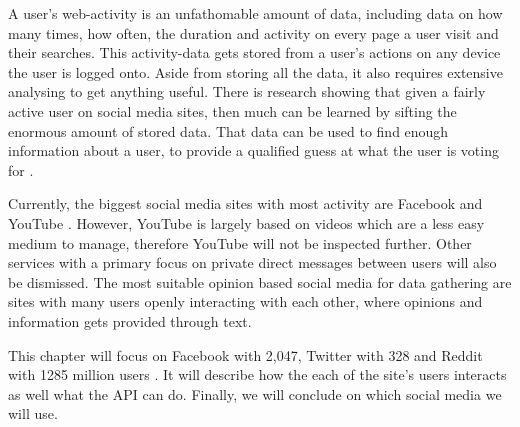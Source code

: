 A user's web-activity is an unfathomable amount of data, including data on how
many times, how often, the duration and activity on every page a user visit and
their searches. This activity-data gets stored from a user's actions on any
device the user is logged onto. Aside from storing all the data, it also
requires extensive analysing to get anything useful. There is research showing
that given a fairly active user on social media sites, then much can be learned
by sifting the enormous amount of stored data. That data can be used to find
enough information about a user, to provide a qualified guess at what the user
is voting for \citep{Personality}.\nl

Currently, the biggest social media sites with most activity are Facebook and
YouTube \citep{SocialMediaStats}. However, YouTube is largely based on videos
which are a less easy medium to manage, therefore YouTube will not be inspected
further. Other services with a primary focus on private direct messages between
users will also be dismissed. The most suitable opinion based social media for
data gathering are sites with many users openly interacting with each other,
where opinions and information gets provided through text.\nl

This chapter will focus on Facebook with 2,047, Twitter with 328 and Reddit with
1285 million users \citep{FacebookPopularity}. It will describe how the each of
the site's users interacts as well what the API can do. Finally, we will
conclude on which social media we will use.

